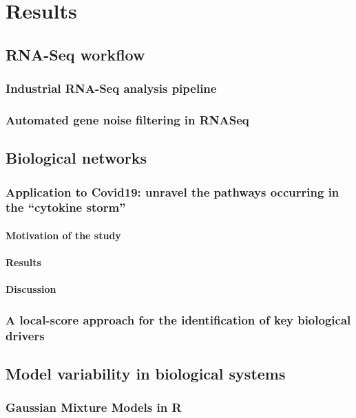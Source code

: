 \chapter{Results}

\section{RNA-Seq workflow}
\subsection{Industrial RNA-Seq analysis pipeline}

\subsection{Automated gene noise filtering in RNASeq}

\section{Biological networks}

\subsection{Application to Covid19: unravel the pathways occurring in the \enquote{cytokine storm}}

\subsubsection{Motivation of the study}
\subsubsection{Results}
\subsubsection{Discussion}

\subsection{A local-score approach for the identification of key biological drivers}

\section{Model variability in biological systems}

\subsection{Gaussian Mixture Models in R}

